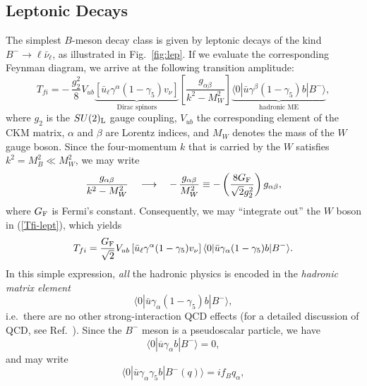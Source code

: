 \documentclass[12pt]{article}
\begin{document}
\subsection{Leptonic Decays}
%
%
%
The simplest $B$-meson decay class is given by leptonic decays 
of the kind $B^-\to \ell\bar\nu_\ell$, as illustrated in Fig.~\ref{fig:lep}.
If we evaluate the corresponding Feynman diagram, we arrive at the 
following transition amplitude:
\begin{equation}\label{Tfi-lept}
T_{fi}=-\,\frac{g_2^2}{8} V_{ub}
\underbrace{\left[\bar u_\ell\gamma^\alpha(1-\gamma_5)v_\nu
\right]}_{\mbox{Dirac spinors}}
\left[\frac{g_{\alpha\beta}}{k^2-M_W^2}\right]
\underbrace{\langle 0|\bar u\gamma^\beta
(1-\gamma_5)b|B^-\rangle}_{\mbox{hadronic ME}},
\end{equation}
where $g_2$ is the $SU(2)_{\rm L}$ gauge coupling, $V_{ub}$ the corresponding
element of the CKM matrix, $\alpha$ and $\beta$ are Lorentz indices,
and $M_W$ denotes the mass of the $W$ gauge boson. Since the four-momentum
$k$ that is carried by the $W$ satisfies $k^2=M_B^2\ll M_W^2$, we may
write
\begin{equation}\label{W-int-out}
\frac{g_{\alpha\beta}}{k^2-M_W^2}\quad\longrightarrow\quad
-\,\frac{g_{\alpha\beta}}{M_W^2}\equiv-\left(\frac{8G_{\rm F}}{\sqrt{2}g_2^2}
\right)g_{\alpha\beta},
\end{equation}
where $G_{\rm F}$ is Fermi's constant. Consequently, we may ``integrate out'' 
the $W$ boson in (\ref{Tfi-lept}), which yields
\begin{equation}\label{Tfi-lept-2}
T_{fi}=\frac{G_{\rm F}}{\sqrt{2}}V_{ub}\left[\bar u_\ell\gamma^\alpha
(1-\gamma_5)v_\nu\right]\langle 0|\bar u\gamma_\alpha(1-\gamma_5)b
|B^-\rangle.
\end{equation}
In this simple expression, {\it all} the hadronic physics is encoded 
in the {\it hadronic matrix element} 
\begin{displaymath}
\langle 0|\bar u\gamma_\alpha(1-\gamma_5)b
|B^-\rangle,
\end{displaymath}
i.e.\ there are no other strong-interaction QCD effects (for a detailed discussion
of QCD, see Ref.~\cite{ecker}). Since the $B^-$ meson is a pseudoscalar particle, 
we have
\begin{equation}\label{ME-rel1}
\langle 0|\overline{u}\gamma_\alpha b|B^-\rangle=0,
\end{equation}
and may write
\begin{equation}\label{ME-rel2}
\langle 0|\bar u\gamma_\alpha\gamma_5 b|B^-(q)\rangle =
i f_B q_\alpha,
\end{equation}
\end{document}
